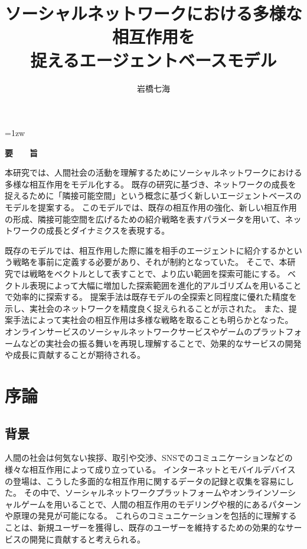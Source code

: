 \documentclass[uplatex,11pt,openany]{ujreport}
\title{ソーシャルネットワークにおける多様な相互作用を\\捉えるエージェントベースモデル}
\author{岩橋七海}
\begin{document}
\maketitle
\thispagestyle{empty}
\newpage

\thispagestyle{empty}
\vspace*{20pt plus 1fil}
\parindent=1zw
\noindent
\begin{center}
{\Large \bf 要　　旨}
\vspace{2cm}
\end{center}
本研究では、人間社会の活動を理解するためにソーシャルネットワークにおける多様な相互作用をモデル化する。
既存の研究に基づき、ネットワークの成長を捉えるために「隣接可能空間」という概念に基づく新しいエージェントベースのモデルを提案する。
このモデルでは、既存の相互作用の強化、新しい相互作用の形成、隣接可能空間を広げるための紹介戦略を表すパラメータを用いて、ネットワークの成長とダイナミクスを表現する。

既存のモデルでは、相互作用した際に誰を相手のエージェントに紹介するかという戦略を事前に定義する必要があり、それが制約となっていた。
そこで、本研究では戦略をベクトルとして表すことで、より広い範囲を探索可能にする。
ベクトル表現によって大幅に増加した探索範囲を進化的アルゴリズムを用いることで効率的に探索する。
提案手法は既存モデルの全探索と同程度に優れた精度を示し、実社会のネットワークを精度良く捉えられることが示された。
また、提案手法によって実社会の相互作用は多様な戦略を取ることも明らかとなった。
オンラインサービスのソーシャルネットワークサービスやゲームのプラットフォームなどの実社会の振る舞いを再現し理解することで、効果的なサービスの開発や成長に貢献することが期待される。




\par
\vspace{0pt plus 1fil}
\newpage

\tableofcontents
\listoffigures

\pagebreak \setcounter{page}{1}

\chapter{序論}
    \section{背景}
    人間の社会は何気ない挨拶、取引や交渉、SNSでのコミュニケーションなどの様々な相互作用によって成り立っている。
    インターネットとモバイルデバイスの登場は、こうした多面的な相互作用に関するデータの記録と収集を容易にした。
    その中で、ソーシャルネットワークプラットフォームやオンラインソーシャルゲームを用いることで、人間の相互作用のモデリングや根的にあるパターンや原理の発見が可能になる。
    これらのコミュニケーションを包括的に理解することは、新規ユーザーを獲得し、既存のユーザーを維持するための効果的なサービスの開発に貢献すると考えられる。
\end{document}

